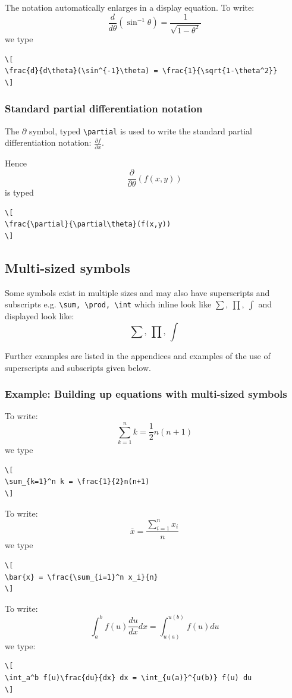 \documentclass[a4paper,14pt]{extarticle}
\begin{document}
The notation automatically enlarges in a display equation. To write:
\[
\frac{d}{d\theta}(\sin^{-1}\theta) = \frac{1}{\sqrt{1-\theta^2}} 
\]
we type
\begin{verbatim}
\[
\frac{d}{d\theta}(\sin^{-1}\theta) = \frac{1}{\sqrt{1-\theta^2}} 
\]
\end{verbatim}


\subsubsection{Standard partial differentiation notation}

The \(\partial\) symbol, typed \verb=\partial= is used to write the standard partial differentiation notation: \(\frac{\partial f}{\partial x}\). 

Hence
\[
\frac{\partial}{\partial\theta}(f(x,y))
\]
is typed
\begin{verbatim}
\[
\frac{\partial}{\partial\theta}(f(x,y))
\]
\end{verbatim}


\subsection{Multi-sized symbols}

Some symbols exist in multiple sizes and may also have superscripts and subscripts e.g. \verb=\sum, \prod, \int= which inline look like \(\sum, \ \prod,\ \int\) and displayed look like:
\[
\sum, \ \prod,\ \int
\]

Further examples are listed in the appendices and examples of the use of superscripts and subscripts given below.

\subsubsection{Example: Building up equations with multi-sized symbols}

To write:
\[
\sum_{k=1}^n k = \frac{1}{2}n(n+1)
\]
we type
\begin{verbatim}
\[
\sum_{k=1}^n k = \frac{1}{2}n(n+1)
\]
\end{verbatim}

To write:
\[
\bar{x} = \frac{\sum_{i=1}^n x_i}{n}
\]
we type
\begin{verbatim}
\[
\bar{x} = \frac{\sum_{i=1}^n x_i}{n}
\]
\end{verbatim}

To write:
\[
\int_a^b f(u)\frac{du}{dx} dx = \int_{u(a)}^{u(b)} f(u) du
\]
we type:
\begin{verbatim}
\[
\int_a^b f(u)\frac{du}{dx} dx = \int_{u(a)}^{u(b)} f(u) du
\]
\end{verbatim}
\end{document}
